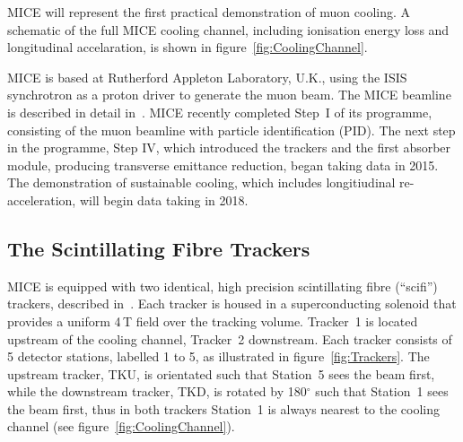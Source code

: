   MICE will represent the first practical demonstration of muon cooling. A schematic of the full MICE cooling channel, including ionisation energy loss and longitudinal accelaration, is shown in figure~\ref{fig:CoolingChannel}.

  MICE is based at Rutherford Appleton Laboratory, U.K., using the ISIS synchrotron as a proton driver to generate the muon beam.  The MICE beamline is described in detail in~\cite{MiceBeamline}.  MICE recently completed Step~I of its programme, consisting of the muon beamline with particle identification (PID). The next step in the programme, Step IV, which introduced the trackers and the first absorber module, producing transverse emittance reduction, began taking data in 2015. The demonstration of sustainable cooling, which includes longitiudinal re-acceleration, will begin data taking in 2018.


  \subsection{The Scintillating Fibre Trackers}
  \label{subsec:Trackers}
  MICE is equipped with two identical, high precision scintillating fibre (``scifi'') trackers, described in~\cite{MiceTrackers}. Each tracker is housed in a superconducting solenoid that provides a uniform 4\,T field over the tracking volume. Tracker~1 is located upstream of the cooling channel, Tracker~2 downstream.  Each tracker consists of 5 detector stations, labelled 1 to 5, as illustrated in figure~\ref{fig:Trackers}. The upstream tracker, TKU, is orientated such that Station~5 sees the beam first, while the downstream tracker, TKD, is rotated by 180$^\circ$ such that Station~1 sees the beam first, thus in both trackers Station~1 is always nearest to the cooling channel (see figure~\ref{fig:CoolingChannel}).
  
